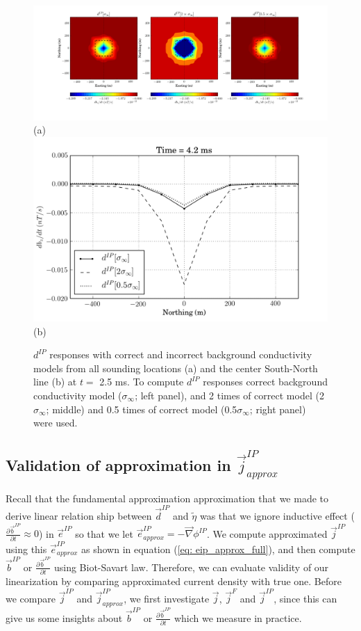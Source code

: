 \documentclass[a4paper, 11pt]{article}
\newcommand{\grad}{\vec \nabla}
\renewcommand {\j}  { {\vec j} }
\renewcommand {\b}  { {\vec b} }
\newcommand {\e}  { {\vec e} }
\renewcommand {\d}  { {\vec d} }
\newcommand{\peta}{\tilde{\eta}}
\begin{document}
\begin{figure}[htb]
  \centering
  \includegraphics[height=0.25\textheight]{figures/synthetic/EMIPCase2_ch35_plan_reg.png} \\
  (a) \\
  \includegraphics[height=0.25\textheight]{figures/synthetic/EMIPCase2_ch35_profile_reg.png} \\
  (b)
  \caption{$d^{IP}$ responses with correct and incorrect background conductivity models from all sounding locations (a) and the center South-North line (b) at $t = $ 2.5 ms. To compute $d^{IP}$ responses correct background conductivity model ($\sigma_{\infty}$; left panel), and 2 times of correct model (2$\sigma_{\infty}$; middle) and 0.5 times of correct model (0.5$\sigma_{\infty}$; right panel) were used. }
  \label{F: Regionalresp_case2}
\end{figure}
\clearpage

\subsection{Validation of approximation in $\j^{IP}_{approx}$}
Recall that the fundamental approximation approximation that we made to derive linear relation ship between $\d^{IP}$ and $\peta$ was that we ignore inductive effect ($\frac{\partial \b^{IP}}{\partial t} \approx 0$) in $\e^{IP}$ so that we let $\e^{IP}_{approx} = -\grad\phi^{IP}$. We compute approximated $\j^{IP}$ using this $\e^{IP}_{approx}$ as shown in equation (\ref{eq: eip_approx_full}), and then compute $\b^{IP}$ or $\frac{\partial \b^{IP}}{\partial t}$ using Biot-Savart law. Therefore, we can evaluate validity of our linearization by comparing approximated current density with true one. Before we compare $\j^{IP}$ and $\j^{IP}_{approx}$, we first investigate $\j$, $\j^{F}$ and $\j^{IP}$, since this can give us some insights about $\b^{IP}$ or $\frac{\partial \b^{IP}}{\partial t}$ which we measure in practice.
\end{document}
